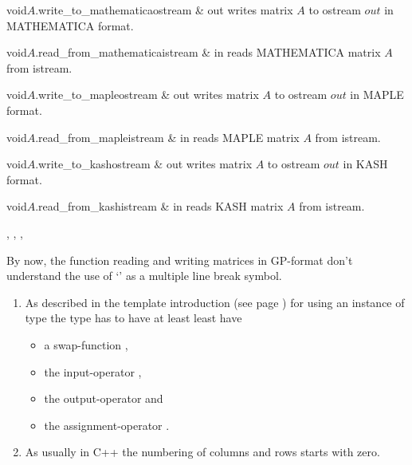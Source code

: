 \begin{cfcode}{void}{$A$.write_to_mathematica}{ostream & out}
  writes matrix $A$ to ostream $out$ in MATHEMATICA format.
\end{cfcode}

\begin{fcode}{void}{$A$.read_from_mathematica}{istream & in}
  reads MATHEMATICA matrix $A$ from istream.
\end{fcode}

\begin{cfcode}{void}{$A$.write_to_maple}{ostream & out}
  writes matrix $A$ to ostream $out$ in MAPLE format.
\end{cfcode}

\begin{fcode}{void}{$A$.read_from_maple}{istream & in}
  reads MAPLE matrix $A$ from istream.
\end{fcode}

\begin{cfcode}{void}{$A$.write_to_kash}{ostream & out}
  writes matrix $A$ to ostream $out$ in KASH format.
\end{cfcode}

\begin{fcode}{void}{$A$.read_from_kash}{istream & in}
  reads KASH matrix $A$ from istream.
\end{fcode}



\SEEALSO

, ,
, 



\BUGS

By now, the function reading and writing matrices in GP-format don't understand the use of
`\bschar' as a multiple line break symbol.



\NOTES

\begin{enumerate}
\item As described in the template introduction (see page \pageref{template_introduction2}) for
  using an instance of type  the type  has to have at least least
  have
  \begin{itemize}
  \item a swap-function ,
  \item the input-operator \code{>>},
  \item the output-operator \code{<<} and
  \item the assignment-operator \code{=}.
  \end{itemize}

\item As usually in C++ the numbering of columns and rows starts with zero.
\end{enumerate}


